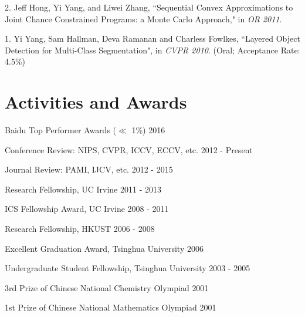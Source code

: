 \documentclass[margin]{res3}
\newenvironment{list1}{
  \begin{list}{\ding{113}}{%
      \setlength{\itemsep}{0.03in}
      \setlength{\parsep}{0in} \setlength{\parskip}{0in}
      \setlength{\topsep}{0in} \setlength{\partopsep}{0in}
      \setlength{\leftmargin}{0in}}}{\end{list}}
\begin{document}
\begin{resume}
\begin{list1}
\item[] 2. Jeff Hong, Yi Yang, and Liwei Zhang, 
``Sequential Convex Approximations to Joint Chance Constrained Programs: a Monte Carlo Approach,"
in \textit{OR 2011}.

\item[] 1. Yi Yang, Sam Hallman, Deva Ramanan and Charless Fowlkes,
``Layered Object Detection for Multi-Class Segmentation",
in \textit{CVPR 2010}. (Oral; Acceptance Rate: 4.5\%)

\end{list1}


\section{\sc Activities and Awards}

\begin{list1}
\item[] Baidu Top Performer Awards ($\ll$ 1\%) \hfill{2016}

\item[] Conference Review: NIPS, CVPR, ICCV, ECCV, etc. \hfill{2012 - Present}

\item[] Journal Review: PAMI, IJCV, etc. \hfill{2012 - 2015}

\item[] Research Fellowship, UC Irvine \hfill{2011 - 2013}

\item[]	ICS Fellowship Award, UC Irvine \hfill{2008 - 2011}

\item[]	Research Fellowship, HKUST \hfill{2006 - 2008}

\item[]	Excellent Graduation Award, Tsinghua University \hfill{2006}

\item[] Undergraduate Student Fellowship, Tsinghua University \hfill{2003 - 2005}

\item[] 3rd Prize of Chinese National Chemistry Olympiad \hfill{2001}

\item[] 1st Prize of Chinese National Mathematics Olympiad \hfill{2001}


\end{list1}
\end{resume}
\end{document}
